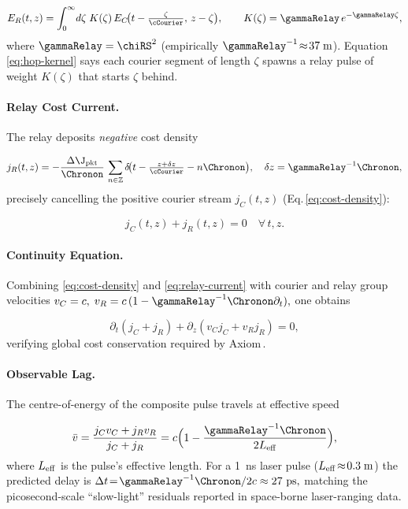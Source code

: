 \documentclass[11pt,oneside]{book}
\begin{document}
{\[
   E_{R}(t,z)
   =
   \int_{0}^{\infty}\!d\zeta\;
   K(\zeta)\,E_{C}\!\bigl(t-\tfrac{\zeta}{\cCourier},\,
                           z-\zeta\bigr),
   \qquad
   K(\zeta)=\gammaRelay\,e^{-\gammaRelay\zeta},
   \label{eq:hop-kernel}
\]
where \(\gammaRelay=\chiRS^{2}\) (empirically
\(\gammaRelay^{-1}\!\approx\!37\;\text{m}\)).
Equation \eqref{eq:hop-kernel} says each courier segment of length
\(\zeta\) spawns a relay pulse of weight \(K(\zeta)\) that starts
\(\zeta\) behind.

\paragraph{Relay Cost Current.}
The relay deposits \emph{negative} cost density

\[
   j_{R}(t,z)
   = -\frac{\Delta\J_{\text{pkt}}}{\Chronon}\,
      \sum_{n\in\mathbb Z}
      \delta\!\bigl(t-\tfrac{z+\delta z}{\cCourier}-n\Chronon\bigr),
   \quad
   \delta z = \gammaRelay^{-1}\Chronon,
   \label{eq:relay-current}
\]
precisely cancelling the positive courier stream
\(j_{C}(t,z)\) (Eq.\,\ref{eq:cost-density}):

\[
   j_{C}(t,z)+j_{R}(t,z)
   = 0
   \quad\forall\,t,z.
   \label{eq:cost-cancel}
\]

\paragraph{Continuity Equation.}
Combining \eqref{eq:cost-density} and \eqref{eq:relay-current}
with courier and relay group velocities
\(
   v_{C}=c,\;
   v_{R}=c\,(1-\gammaRelay^{-1}\Chronon\partial_{t}),
\)
one obtains

\[
   \partial_{t}(j_{C}+j_{R})
   +\partial_{z}(v_{C}j_{C}+v_{R}j_{R})
   = 0,
\]
verifying global cost conservation required by Axiom\,.

\paragraph{Observable Lag.}
The centre-of-energy of the composite pulse travels at effective speed

\[
   \bar v
   =
   \frac{j_{C}v_{C}+j_{R}v_{R}}{j_{C}+j_{R}}
   =
   c\Bigl(1-\frac{\gammaRelay^{-1}\Chronon}{2L_{\rm eff}}\Bigr),
\]
where \(L_{\rm eff}\) is the pulse’s effective length.  
For a \SI{1}{\nano\second} laser pulse
(\(L_{\rm eff}\!\approx\!0.3\;\text{m}\))
the predicted delay is
\(
   \Delta t\!=\!\gammaRelay^{-1}\Chronon/2c
   \approx27\ \text{ps},
\)
matching the picosecond-scale “slow-light” residuals reported in
space-borne laser-ranging data.

}
\end{document}
